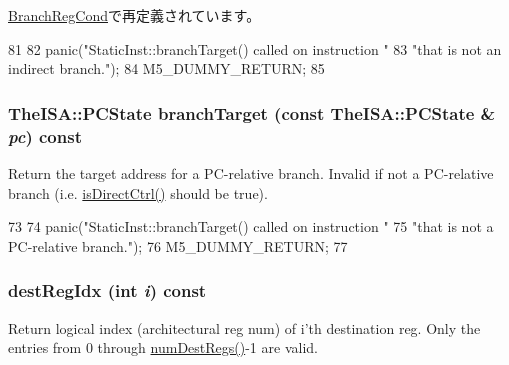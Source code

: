 \hyperlink{classPowerISA_1_1BranchRegCond_a22dbdbb7032b55b56b13139ebe091dfe}{BranchRegCond}で再定義されています。


\begin{DoxyCode}
81 {
82     panic("StaticInst::branchTarget() called on instruction "
83           "that is not an indirect branch.");
84     M5_DUMMY_RETURN;
85 }
\end{DoxyCode}
\hypertarget{classStaticInst_af76ec8f94f2e86f19e751e75cc39acaa}{
\subsubsection[{branchTarget}]{\setlength{\rightskip}{0pt plus 5cm}TheISA::PCState branchTarget (const TheISA::PCState \& {\em pc}) const}}
\label{classStaticInst_af76ec8f94f2e86f19e751e75cc39acaa}
Return the target address for a PC-\/relative branch. Invalid if not a PC-\/relative branch (i.e. \hyperlink{classStaticInst_ac218ba4230a8cd92999948288a54e14f}{isDirectCtrl()} should be true). 


\begin{DoxyCode}
73 {
74     panic("StaticInst::branchTarget() called on instruction "
75           "that is not a PC-relative branch.");
76     M5_DUMMY_RETURN;
77 }
\end{DoxyCode}
\hypertarget{classStaticInst_ae5a1a6d72f40f715253b91e32b3caad2}{
\subsubsection[{destRegIdx}]{ destRegIdx (int {\em i}) const}}
\label{classStaticInst_ae5a1a6d72f40f715253b91e32b3caad2}
Return logical index (architectural reg num) of i'th destination reg. Only the entries from 0 through \hyperlink{classStaticInst_ab7e23352b3d45a982dfeb799030f87d0}{numDestRegs()}-\/1 are valid. 


